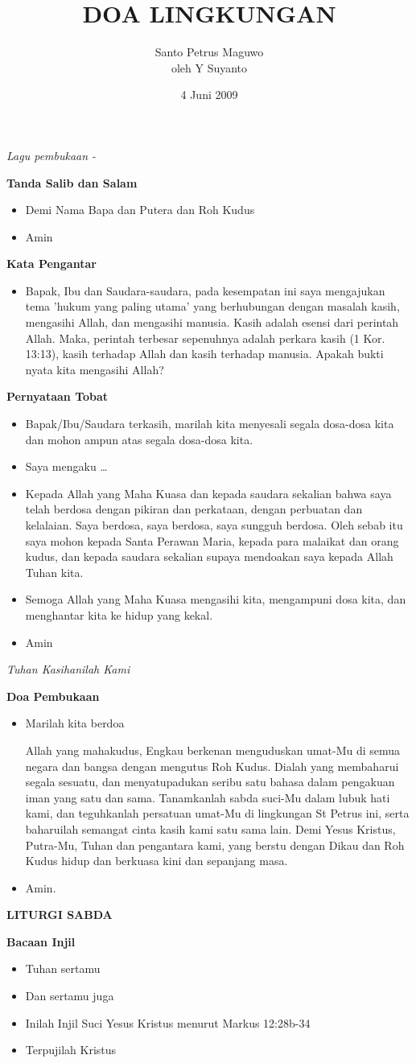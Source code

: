 \documentclass[a4paper,12pt]{scrartcl}
\title{DOA LINGKUNGAN}
\author{
Santo Petrus Maguwo \\
oleh Y Suyanto}
\date{4 Juni 2009}
\makeatletter
\newcommand{\judul}[1]{%
  {\parindent \z@ \centering 
    \interlinepenalty\@M \Large \bfseries #1\par\nobreak \vskip 20\p@ }}
\newcommand{\subjudul}[1]{%
  {\parindent \z@ 
    \interlinepenalty\@M \bfseries #1\par\nobreak \vskip 10\p@ }}
\newcommand{\lagu}[1]{%
  {\parindent \z@ 
    \interlinepenalty\@M \slshape \mdseries \Large \textsl{#1}\par\nobreak \vskip 20\p@ }}
\newcommand{\BU}[1]{\begin{itemize} \item[U:] #1 \end{itemize}}
\newcommand{\BP}[1]{\begin{itemize} \item[P:] #1 \end{itemize}}
\newcommand{\lagupembukaan}{~}
\makeatother
\begin{document}
\sffamily
\maketitle
\thispagestyle{empty}

\lagu{Lagu pembukaan - \lagupembukaan}

\subjudul{Tanda Salib dan Salam}
\BP{Demi Nama Bapa dan Putera dan Roh Kudus}
\BU{Amin}

\subjudul{Kata Pengantar}
\BP{Bapak, Ibu dan Saudara-saudara, pada kesempatan ini saya mengajukan tema 'hukum yang paling utama' yang berhubungan dengan masalah kasih, mengasihi Allah, dan mengasihi manusia. Kasih adalah esensi dari perintah Allah. Maka, perintah terbesar sepenuhnya adalah perkara kasih (1 Kor. 13:13), kasih terhadap Allah dan kasih terhadap manusia. Apakah bukti nyata kita mengasihi Allah?}

\subjudul{Pernyataan Tobat}
\BU{Bapak/Ibu/Saudara terkasih, marilah kita menyesali segala dosa-dosa kita dan
mohon ampun atas segala dosa-dosa kita.}
\BP{Saya mengaku \dots}
\BU{Kepada Allah yang Maha Kuasa dan kepada saudara sekalian bahwa saya telah
berdosa dengan pikiran dan perkataan, dengan perbuatan dan kelalaian. Saya
berdosa, saya berdosa, saya sungguh berdosa. Oleh sebab itu saya mohon kepada
Santa Perawan Maria, kepada para malaikat dan orang kudus, dan kepada saudara
sekalian supaya mendoakan saya kepada Allah Tuhan kita.}
\BP{Semoga Allah yang Maha Kuasa mengasihi kita, mengampuni dosa kita, dan
menghantar kita ke hidup yang kekal.}
\BU{Amin}

\lagu{Tuhan Kasihanilah Kami}

\subjudul{Doa Pembukaan}
\BP{Marilah kita berdoa

Allah yang mahakudus, Engkau berkenan menguduskan umat-Mu di semua negara dan bangsa dengan mengutus Roh Kudus. Dialah yang membaharui segala sesuatu, dan menyatupadukan seribu satu bahasa dalam pengakuan iman yang satu dan sama. Tanamkanlah sabda suci-Mu dalam lubuk hati kami, dan teguhkanlah persatuan umat-Mu di lingkungan St Petrus ini, serta baharuilah semangat cinta kasih kami satu sama lain.
Demi Yesus Kristus, Putra-Mu, Tuhan dan pengantara kami, yang berstu dengan Dikau dan Roh Kudus hidup dan berkuasa kini dan sepanjang masa.}

\BU{Amin.}

\judul{LITURGI SABDA}

\subjudul{Bacaan Injil}
\BP{Tuhan sertamu}
\BU{Dan sertamu juga}
\BP{Inilah Injil Suci Yesus Kristus menurut Markus 12:28b-34}
\BU{Terpujilah Kristus}
\end{document}
